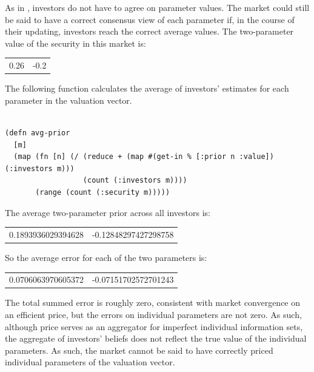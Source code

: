 \documentclass[11pt]{article}
\begin{document}
As in \citet{verrecchiaConsensusBeliefsInformation1980}, investors do not have to agree on parameter values. The market could still be said to have a correct consensus view of each parameter if, in the course of their updating, investors reach the correct average values. The two-parameter value of the security in this market is:
\begin{center}
\begin{tabular}{rr}
0.26 & -0.2\\
\end{tabular}
\end{center}

The following function calculates the average of investors' estimates for each parameter in the valuation vector.

\singlespacing
\lstset{language=Lisp,label= ,caption= ,captionpos=b,numbers=none}
\begin{lstlisting}

(defn avg-prior
  [m]
  (map (fn [n] (/ (reduce + (map #(get-in % [:prior n :value]) (:investors m)))
                  (count (:investors m))))
       (range (count (:security m)))))

\end{lstlisting}
\doublespacing

The average two-parameter prior across all investors is:
\begin{center}
\begin{tabular}{rr}
0.1893936029394628 & -0.12848297427298758\\
\end{tabular}
\end{center}

So the average error for each of the two parameters is:
\begin{center}
\begin{tabular}{rr}
0.0706063970605372 & -0.07151702572701243\\
\end{tabular}
\end{center}

The total summed error is roughly zero, consistent with market convergence on an efficient price, but the errors on individual parameters are not zero. As such, although price serves as an aggregator for imperfect individual information sets, the aggregate of investors' beliefs does not reflect the true value of the individual parameters. As such, the market cannot be said to have correctly priced individual parameters of the valuation vector.
\end{document}
